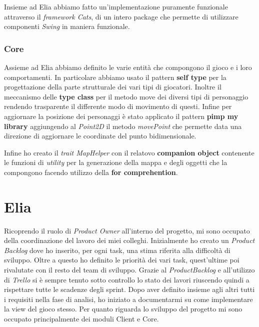 Insieme ad Elia abbiamo fatto un'implementazione puramente funzionale attraverso il
\textit{framework Cats}, di un intero package che permette di utilizzare componenti \textit{Swing}
in maniera funzionale.

\subsubsection{Core}
Assieme ad Elia abbiamo definito le varie entità che compongono il gioco e i loro comportamenti. In particolare abbiamo usato il pattern \textbf{self type} per la progettazione della parte strutturale dei vari tipi di giocatori. Inoltre il meccanismo delle \textbf{type class} per il metodo move dei diversi tipi di personaggio rendendo trasparente il differente modo di movimento di questi. Infine per aggiornare la posizione dei personaggi è stato applicato il pattern \textbf{pimp my library} aggiungendo al \textit{Point2D} il metodo \textit{movePoint} che permette data una direzione di aggiornare le coordinate del punto bidimensionale.

Infine ho creato il \textit{trait MapHelper} con il relatovo \textbf{companion object} contenente le funzioni di \textit{utility} per la generazione della mappa e degli oggetti che la compongono facendo utilizzo della \textbf{for comprehention}.

\section{Elia}

Ricoprendo il ruolo di \textit{Product Owner} all’interno del progetto, mi sono occupato della coordinazione del lavoro dei miei colleghi. 
Inizialmente ho creato un \textit{Product Backlog} dove ho inserito, per ogni task, una stima riferita alla difficoltà di sviluppo. Oltre a questo ho definito le priorità dei vari task, quest’ultime poi rivalutate con il resto del team di sviluppo.
Grazie al \textit{ProductBacklog} e all’utilizzo di \textit{Trello} si è sempre tenuto sotto controllo lo stato dei lavori riuscendo quindi a rispettare tutte le scadenze degli sprint.
Dopo aver definito insieme agli altri tutti i requisiti nella fase di analisi, ho iniziato a documentarmi su come implementare la view del gioco stesso. 
Per quanto riguarda lo sviluppo del progetto mi sono occupato principalmente dei moduli Client e Core.


